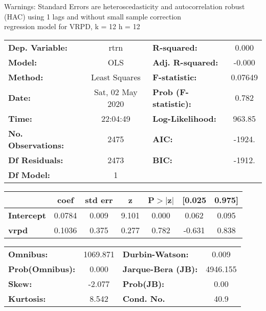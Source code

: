 Warnings: \newline
 [1] Standard Errors are heteroscedasticity and autocorrelation robust (HAC) using 1 lags and without small sample correction\\ 

regression model for VRPD, k = 12 h = 12\begin{center}
\begin{tabular}{lclc}
\toprule
\textbf{Dep. Variable:}    &       rtrn       & \textbf{  R-squared:         } &     0.000   \\
\textbf{Model:}            &       OLS        & \textbf{  Adj. R-squared:    } &    -0.000   \\
\textbf{Method:}           &  Least Squares   & \textbf{  F-statistic:       } &   0.07649   \\
\textbf{Date:}             & Sat, 02 May 2020 & \textbf{  Prob (F-statistic):} &    0.782    \\
\textbf{Time:}             &     22:04:49     & \textbf{  Log-Likelihood:    } &    963.85   \\
\textbf{No. Observations:} &        2475      & \textbf{  AIC:               } &    -1924.   \\
\textbf{Df Residuals:}     &        2473      & \textbf{  BIC:               } &    -1912.   \\
\textbf{Df Model:}         &           1      & \textbf{                     } &             \\
\bottomrule
\end{tabular}
\begin{tabular}{lcccccc}
                   & \textbf{coef} & \textbf{std err} & \textbf{z} & \textbf{P$> |$z$|$} & \textbf{[0.025} & \textbf{0.975]}  \\
\midrule
\textbf{Intercept} &       0.0784  &        0.009     &     9.101  &         0.000        &        0.062    &        0.095     \\
\textbf{vrpd}      &       0.1036  &        0.375     &     0.277  &         0.782        &       -0.631    &        0.838     \\
\bottomrule
\end{tabular}
\begin{tabular}{lclc}
\textbf{Omnibus:}       & 1069.871 & \textbf{  Durbin-Watson:     } &    0.009  \\
\textbf{Prob(Omnibus):} &   0.000  & \textbf{  Jarque-Bera (JB):  } & 4946.155  \\
\textbf{Skew:}          &  -2.077  & \textbf{  Prob(JB):          } &     0.00  \\
\textbf{Kurtosis:}      &   8.542  & \textbf{  Cond. No.          } &     40.9  \\
\bottomrule
\end{tabular}
\end{center}

